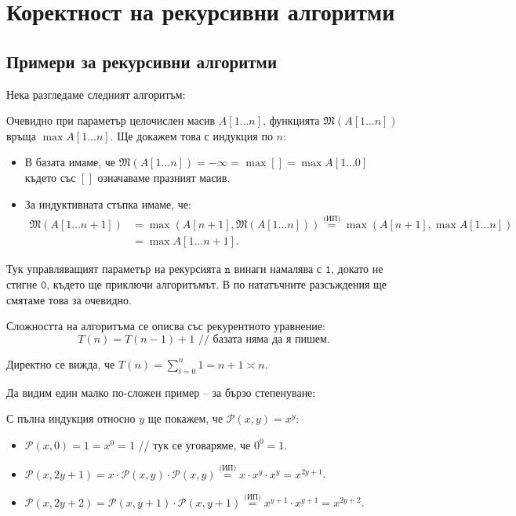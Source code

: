 \chapter{Коректност на рекурсивни алгоритми}

\section{Примери за рекурсивни алгоритми}

Нека разгледаме следният алгоритъм:


Очевидно при параметър целочислен масив $A[1 \dots n]$, функцията $\mathfrak{M}(A[1 \dots n])$ връща $\max A[1 \dots n]$.
Ще докажем това с индукция по $n$:
\begin{itemize}
    \item В базата имаме, че $\mathfrak{M}(A[1 \dots n]) = -\infty = \max [] = \max A[1 \dots 0]$ където със $[]$ означаваме празният масив.
    \item За индуктивната стъпка имаме, че:
          \begin{align*}
              \mathfrak{M}(A[1 \dots n + 1]) & = \max(A[n + 1], \mathfrak{M}(A[1 \dots n])) \stackrel{\text{(ИП)}}{=} \max(A[n + 1], \max A[1 \dots n]) \\
                                             & = \max A[1 \dots n + 1].
          \end{align*}
\end{itemize}

Тук управляващият параметър на рекурсията $\mathtt{n}$ винаги намалява с $\mathtt{1}$, докато не стигне $\mathtt{0}$, където ще приключи алгоритъмът.
В по нататъчните разсъждения ще смятаме това за очевидно.

Сложността на алгоритъма се описва със рекурентното уравнение:
\[
    T(n) = T(n - 1) + 1 \text{ // базата няма да я пишем}.
\]

Директно се вижда, че $T(n) = \sum\limits_{i = 0}^n 1 = n + 1 \asymp n$.

Да видим един малко по-сложен пример -- за бързо степенуване:


С пълна индукция относно $y$ ще покажем, че $\mathcal{P}(x, y) = x^y$:
\begin{itemize}
    \item $\mathcal{P}(x, 0) = 1 = x^0 = 1$ // тук се уговаряме, че $0^0 = 1$.
    \item $\mathcal{P}(x, 2y + 1) = x \cdot \mathcal{P}(x, y) \cdot \mathcal{P}(x, y) \stackrel{\text{(ИП)}}{=} x \cdot x^y \cdot x^y = x^{2y + 1}$.
    \item $\mathcal{P}(x, 2y + 2) = \mathcal{P}(x, y + 1) \cdot \mathcal{P}(x, y + 1) \stackrel{\text{(ИП)}}{=} x^{y + 1} \cdot x^{y + 1} = x^{2y + 2}$.
\end{itemize}

